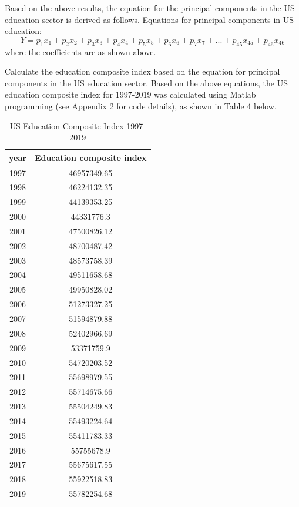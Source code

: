 \documentclass{apmcmthesis}
\begin{document}
Based on the above results, the equation for the principal components in the US education sector is derived as follows.
Equations for principal components in US education:
\begin{equation}
Y=p_1x_1+p_2x_2+p_3x_3+p_4x_4+p_5x_5+p_6x_6+p_7x_7+...+p_{45}x_{45}+p_{46}x_{46}
\end{equation}
where the coefficients are as shown above.

Calculate the education composite index based on the equation for principal components in the US education sector.
Based on the above equations, the US education composite index for 1997-2019 was calculated using Matlab programming (see Appendix 2 for code details), as shown in Table 4 below.

\begin{table}[H]
	\caption{US Education Composite Index 1997-2019}\label{tab:104} \centering
	\begin{tabular}{cc}
		\toprule[1.5pt]
		year & Education composite index \\
			\midrule[1pt]
		1997 & 46957349.65               \\
		1998 & 46224132.35               \\
		1999 & 44139353.25               \\
		2000 & 44331776.3                \\
		2001 & 47500826.12               \\
		2002 & 48700487.42               \\
		2003 & 48573758.39               \\
		2004 & 49511658.68               \\
		2005 & 49950828.02               \\
		2006 & 51273327.25               \\
		2007 & 51594879.88               \\
		2008 & 52402966.69               \\
		2009 & 53371759.9                \\
		2010 & 54720203.52               \\
		2011 & 55698979.55               \\
		2012 & 55714675.66               \\
		2013 & 55504249.83               \\
		2014 & 55493224.64               \\
		2015 & 55411783.33               \\
		2016 & 55755678.9                \\
		2017 & 55675617.55               \\
		2018 & 55922518.83               \\
		2019 & 55782254.68               \\
			\bottomrule[1.5pt]      
	\end{tabular}
\end{table}
\end{document}
